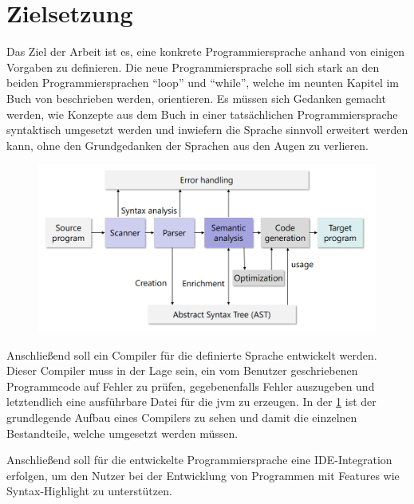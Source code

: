 \section{Zielsetzung}
Das Ziel der Arbeit ist es, eine konkrete Programmiersprache anhand von einigen Vorgaben zu definieren. Die neue Programmiersprache soll sich stark an den beiden Programmiersprachen \enquote{loop} und \enquote{while}, welche im neunten Kapitel im Buch  von \citeauthor{GottfriedVossen2016} beschrieben werden, orientieren. \cite{GottfriedVossen2016} Es müssen sich Gedanken gemacht werden, wie Konzepte aus dem Buch in einer tatsächlichen Programmiersprache syntaktisch umgesetzt werden und inwiefern die Sprache sinnvoll erweitert werden kann, ohne den Grundgedanken der Sprachen aus den Augen zu verlieren.



\begin{figure}[h!]
	\centering
	\includegraphics[width=12cm]{content/pictures/compiler.png}
	\label{pic:CompilerAufbau}
\end{figure}

Anschließend soll ein Compiler für die definierte Sprache entwickelt werden. Dieser Compiler muss in der Lage sein, ein vom Benutzer geschriebenen Programmcode auf Fehler zu prüfen, gegebenenfalls Fehler auszugeben und letztendlich eine ausführbare Datei für die \ac{jvm} zu erzeugen. In der \cref{pic:CompilerAufbau} ist der grundlegende Aufbau eines Compilers zu sehen und damit die einzelnen Bestandteile, welche umgesetzt werden müssen.

Anschließend soll für die entwickelte Programmiersprache eine IDE-Integration erfolgen, um den Nutzer bei der Entwicklung von Programmen mit Features wie Syntax-Highlight zu unterstützen.